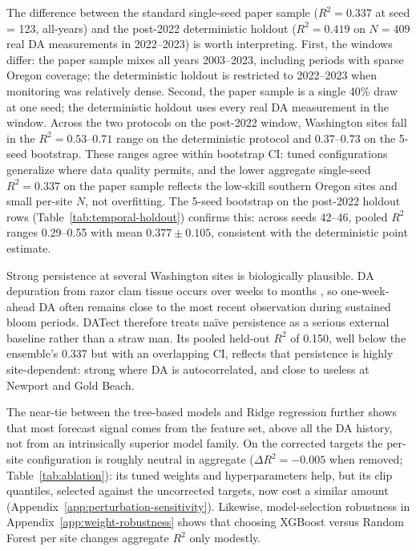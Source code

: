 \documentclass[toxins,article,submit,moreauthors]{Definitions/mdpi}
\begin{document}
The difference between the standard single-seed paper sample ($R^2 = 0.337$ at seed = 123, all-years) and the post-2022 deterministic holdout ($R^2 = 0.419$ on $N = 409$ real DA measurements in 2022--2023) is worth interpreting. First, the windows differ: the paper sample mixes all years 2003--2023, including periods with sparse Oregon coverage; the deterministic holdout is restricted to 2022--2023 when monitoring was relatively dense. Second, the paper sample is a single 40\% draw at one seed; the deterministic holdout uses every real DA measurement in the window. Across the two protocols on the post-2022 window, Washington sites fall in the $R^2 = 0.53$--$0.71$ range on the deterministic protocol and $0.37$--$0.73$ on the 5-seed bootstrap. These ranges agree within bootstrap CI: tuned configurations generalize where data quality permits, and the lower aggregate single-seed $R^2 = 0.337$ on the paper sample reflects the low-skill southern Oregon sites and small per-site $N$, not overfitting. The 5-seed bootstrap on the post-2022 holdout rows (Table~\ref{tab:temporal-holdout}) confirms this: across seeds 42--46, pooled $R^2$ ranges 0.29--0.55 with mean $0.377 \pm 0.105$, consistent with the deterministic point estimate.

Strong persistence at several Washington sites is biologically plausible. DA depuration from razor clam tissue occurs over weeks to months \cite{Drum1993, Wekell1994}, so one-week-ahead DA often remains close to the most recent observation during sustained bloom periods. DATect therefore treats na\"ive persistence as a serious external baseline rather than a straw man. Its pooled held-out $R^2$ of 0.150, well below the ensemble's 0.337 but with an overlapping CI, reflects that persistence is highly site-dependent: strong where DA is autocorrelated, and close to useless at Newport and Gold Beach.

The near-tie between the tree-based models and Ridge regression further shows that most forecast signal comes from the feature set, above all the DA history, not from an intrinsically superior model family. On the corrected targets the per-site configuration is roughly neutral in aggregate ($\Delta R^2 = -0.005$ when removed; Table~\ref{tab:ablation}): its tuned weights and hyperparameters help, but its clip quantiles, selected against the uncorrected targets, now cost a similar amount (Appendix~\ref{app:perturbation-sensitivity}). Likewise, model-selection robustness in Appendix~\ref{app:weight-robustness} shows that choosing XGBoost versus Random Forest per site changes aggregate $R^2$ only modestly.
\end{document}
